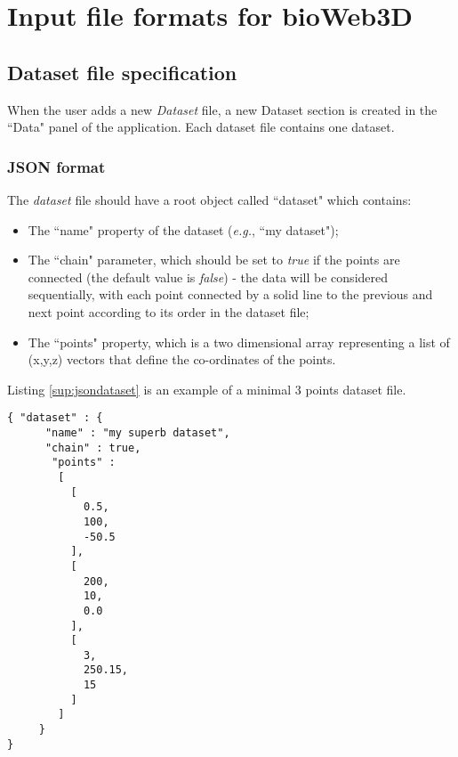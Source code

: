 \chapter{Input file formats for bioWeb3D}\label{sup:bioweb3d}


\section{Dataset file specification}
When the user adds a new {\it{Dataset}} file, a new Dataset section is created in the ``Data" panel of the application. Each dataset file contains one dataset.\\
	\subsection{JSON format}
The {\it{dataset}} file should have a root object called ``dataset" which contains: \begin{itemize}
\item{The ``name" property of the dataset (\textit{e.g.}, ``my dataset");}
\item{The ``chain" parameter, which should be set to \textit{true} if the points are connected (the default value is \textit{false}) - the data will be considered sequentially, with each point connected by a solid line to the previous and next point according to its order in the dataset file;}
\item{The ``points" property, which is a two dimensional array representing a list of (x,y,z) vectors that define the co-ordinates of the points.}
\end{itemize}

Listing \ref{sup:jsondataset} is an example of a minimal 3 points dataset file.

\begin{lstlisting}[float,caption=Json dataset file,label=sup:jsondataset]
{ "dataset" : {
      "name" : "my superb dataset",
      "chain" : true,
       "points" :
        [
          [
            0.5,
            100,
            -50.5
          ],
          [
            200,
            10,
            0.0
          ],
          [
            3,
            250.15,
            15
          ]
        ]
     }
}
\end{lstlisting}

